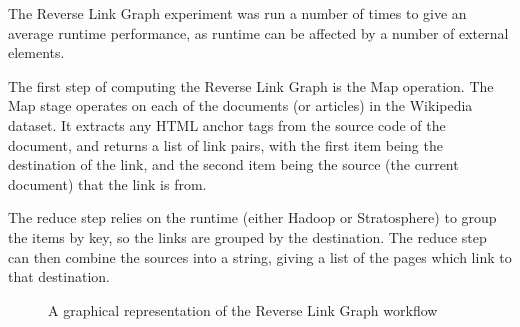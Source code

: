 The Reverse Link Graph experiment was run a number of times to give an average runtime performance, as runtime can be affected by a number of external elements. 

The first step of computing the Reverse Link Graph is the Map operation. The Map stage operates on each of the documents (or articles) in the Wikipedia dataset. It extracts any HTML anchor tags from the source code of the document, and returns a list of link pairs, with the first item being the destination of the link, and the second item being the source (the current document) that the link is from.

The reduce step relies on the runtime (either Hadoop or Stratosphere) to group the items by key, so the links are grouped by the destination. The reduce step can then combine the sources into a string, giving a list of the pages which link to that destination. 

\begin{figure}[H]

\caption{A graphical representation of the Reverse Link Graph workflow}
\end{figure}

